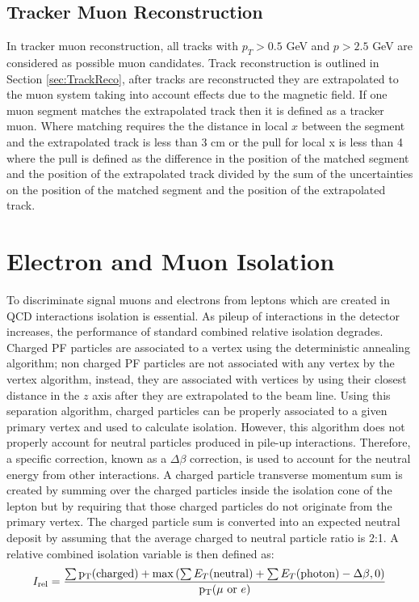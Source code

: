 \subsection{Tracker Muon Reconstruction}
In tracker muon reconstruction, all tracks with $p_{T}>0.5$ GeV
and $p>2.5$ GeV are considered as possible muon candidates. 
Track reconstruction is outlined in Section \ref{sec:TrackReco},
after tracks are reconstructed they are extrapolated to the muon
system taking into account effects due to the magnetic field.
If one muon segment matches the extrapolated track then 
it is defined as a tracker muon.  Where matching requires
the the distance in local $x$ between the segment and the extrapolated
track is less than 3 cm or the pull for local x is less than 4 where
the pull is defined as the difference in the position of the matched segment
and the position of the extrapolated track divided by the sum of 
the uncertainties on the position of the matched segment
and the position of the extrapolated track.
\section{Electron and Muon Isolation}
To discriminate signal muons and electrons from leptons
which are created in QCD interactions isolation is essential. %
As pileup of interactions in the detector increases, the performance of standard
combined relative isolation degrades. Charged PF particles are associated to
a vertex using the deterministic annealing algorithm; non charged PF particles
are not associated with any vertex by the vertex algorithm, instead,
they are associated with vertices by using their closest distance in the
$z$ axis after they are extrapolated to the beam line. Using this separation algorithm,
charged particles can be properly associated to a given primary vertex
and used to calculate isolation. However, this algorithm does not
properly account for neutral particles produced in pile-up interactions. 
Therefore, a specific correction, known as a $\Delta \beta$ correction, is
used to account for the neutral energy from other interactions.
A charged particle transverse momentum sum is created by summing over
the charged particles inside the isolation cone of the lepton but by
requiring that those charged particles do not originate from the primary vertex.
The charged particle sum is converted into an expected neutral deposit by
assuming that the average charged to neutral particle ratio is 2:1.
A relative combined isolation variable is then defined as:
\begin{equation}
I_{\rm rel} = \frac{\sum{\mathrm{p_{T}}(\mathrm{charged})} + \max\left(\sum{E_{T}(\mathrm{neutral})} + \sum{E_{T}(\mathrm{photon})} - \Delta\beta, 0\right)}{\mathrm{p_{T}}(\mu \, \, \mathrm{or} \,\, e)}
\label{eq:relIso}
\end{equation}


